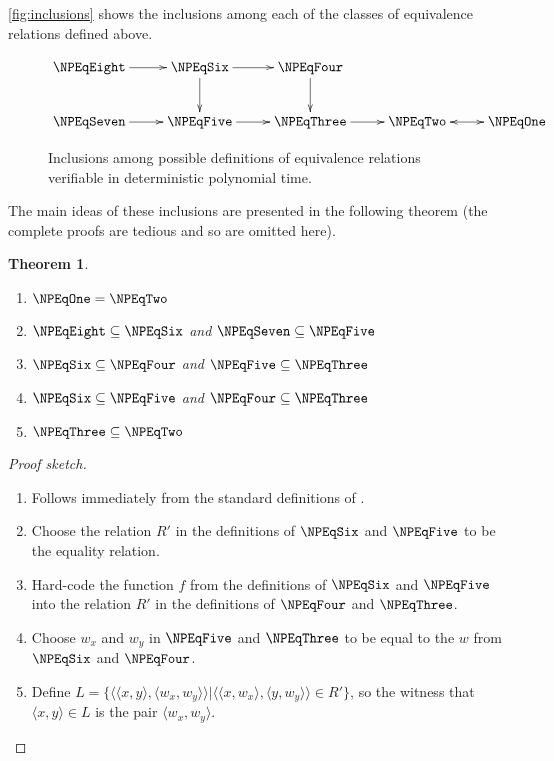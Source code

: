 \documentclass[draft]{article}
\newtheorem{theorem}{Theorem}[section]
\theoremstyle{definition} \newtheorem{openproblem}[openproblem]{Open problem}
\theoremstyle{definition} \newtheorem{definition}[definition]{Definition}
\theoremstyle{remark} \newtheorem{remark}[remark]{Remark}
\newenvironment{sketch}{\begin{proof}[Proof sketch]}{\end{proof}}
\newcommand{\pair}[2]{\langle#1,#2\rangle} %
\begin{document}
\autoref{fig:inclusions} shows the inclusions among each of the classes of equivalence relations defined above.
\begin{figure}
  \caption{\label{fig:inclusions}Inclusions among possible definitions of equivalence relations verifiable in deterministic polynomial time.}
  \begin{displaymath}
    \xymatrix{%
      \NPEqEight \ar[r] & \NPEqSix \ar[d] \ar[r] & \NPEqFour \ar[d] \\
      \NPEqSeven \ar[r] & \NPEqFive \ar[r] & \NPEqThree \ar[r] & \NPEqTwo \ar@{<->}[r] & \NPEqOne }
  \end{displaymath}
\end{figure}
The main ideas of these inclusions are presented in the following theorem (the complete proofs are tedious and so are omitted here).
\begin{theorem}\mbox{}
  \begin{enumerate}
  \item $\NPEqOne=\NPEqTwo$
  \item $\NPEqEight\subseteq\NPEqSix$ and $\NPEqSeven\subseteq\NPEqFive$
  \item $\NPEqSix\subseteq\NPEqFour$ and $\NPEqFive\subseteq\NPEqThree$
  \item $\NPEqSix\subseteq\NPEqFive$ and $\NPEqFour\subseteq\NPEqThree$
  \item $\NPEqThree\subseteq\NPEqTwo$
  \end{enumerate}
\end{theorem}
\begin{sketch}\mbox{}
  \begin{enumerate}
  \item Follows immediately from the standard definitions of \NP.
  \item Choose the relation $R'$ in the definitions of $\NPEqSix$ and $\NPEqFive$ to be the equality relation.
  \item Hard-code the function $f$ from the definitions of $\NPEqSix$ and $\NPEqFive$ into the relation $R'$ in the definitions of $\NPEqFour$ and $\NPEqThree$.
  \item Choose $w_x$ and $w_y$ in $\NPEqFive$ and $\NPEqThree$ to be equal to the $w$ from $\NPEqSix$ and $\NPEqFour$.
  \item Define $L=\{\pair{\pair{x}{y}}{\pair{w_x}{w_y}}|\pair{\pair{x}{w_x}}{\pair{y}{w_y}}\in R'\}$, so the witness that $\pair{x}{y}\in L$ is the pair $\pair{w_x}{w_y}$.\qedhere
  \end{enumerate}
\end{sketch}
\end{document}
